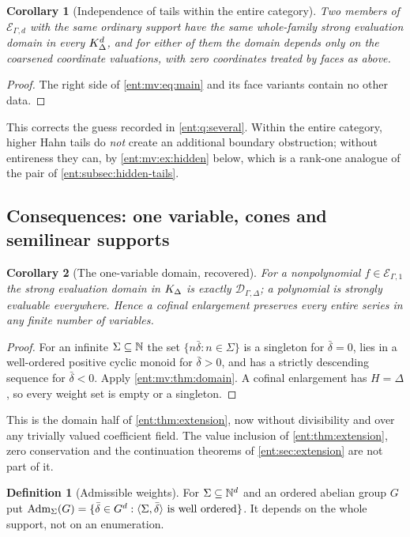 \documentclass[11pt]{article}
\theoremstyle{plain}
\theoremstyle{plain}
\theoremstyle{plain}
\newtheorem{corollary}[corollary]{Corollary}
\theoremstyle{definition}
\newtheorem{definition}[definition]{Definition}
\theoremstyle{definition}
\theoremstyle{definition}
\theoremstyle{definition}
\theoremstyle{remark}
\newcommand{\Dom}{\mathcal D_{\Gamma,\Delta}}
\newcommand{\inner}[2]{\langle#1,#2\rangle}
\begin{document}
\begin{corollary}[Independence of tails within the entire category]
\label{ent:mv:cor:tails}
Two members of $\mathcal E_{\Gamma,d}$ with the same ordinary support have the
same whole-family strong evaluation domain in every $K_\Delta^d$, and for either
of them the domain depends only on the coarsened coordinate valuations, with
zero coordinates treated by faces as above.
\end{corollary}
\begin{proof}
The right side of \eqref{ent:mv:eq:main} and its face variants contain no
other data.
\end{proof}

This corrects the guess recorded in \cref{ent:q:several}. Within the entire
category, higher Hahn tails do \emph{not} create an additional boundary
obstruction; without entireness they can, by \cref{ent:mv:ex:hidden} below,
which is a rank-one analogue of the pair of \cref{ent:subsec:hidden-tails}.

\subsection{Consequences: one variable, cones and semilinear supports}
\label{ent:mv:subsec:cones}

\begin{corollary}[The one-variable domain, recovered]\label{ent:mv:cor:onevar}
For a nonpolynomial $f\in\mathcal E_{\Gamma,1}$ the strong evaluation domain in
$K_\Delta$ is exactly $\Dom$; a polynomial is strongly evaluable everywhere. Hence
a cofinal enlargement preserves every entire series in any finite number of
variables.
\end{corollary}
\begin{proof}
For an infinite $\Sigma\subseteq\mathbb N$ the set $\{n\bar\delta:n\in\Sigma\}$ is a
singleton for $\bar\delta=0$, lies in a well-ordered positive cyclic monoid
for $\bar\delta>0$, and has a strictly descending sequence for $\bar\delta<0$.
Apply \cref{ent:mv:thm:domain}. A cofinal enlargement has $H=\Delta$, so every
weight set is empty or a singleton.
\end{proof}

This is the domain half of \cref{ent:thm:extension}, now without
divisibility and over any trivially valued coefficient field. The value
inclusion of \cref{ent:thm:extension}, zero conservation and the continuation
theorems of \cref{ent:sec:extension} are not part of it.

\begin{definition}[Admissible weights]\label{ent:mv:def:adm}
For $\Sigma\subseteq\mathbb N^d$ and an ordered abelian group $G$ put
$\Adm_\Sigma(G)=\{\bar\delta\in G^d:\inner\Sigma{\bar\delta}\text{ is well
ordered}\}$. It depends on the whole support, not on an enumeration.
\end{definition}
\end{document}
